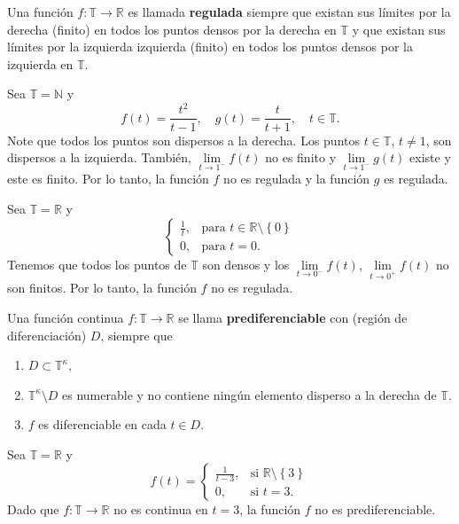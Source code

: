 \begin{frame}
\begin{definition}
Una función $f\colon\mathds{T}\rightarrow\mathds{R}$ es llamada \textbf{regulada} siempre que existan sus límites por la derecha (finito) en todos los puntos densos por la derecha en $\mathds{T}$ y que existan sus límites por la izquierda izquierda (finito) en todos los puntos densos por la izquierda en $\mathds{T}$.
\end{definition}

\begin{example}
Sea $\mathds{T}=\mathds{N}$ y \[ f\left(t\right)=\frac{t^{2}}{t-1},\quad g\left(t\right)=\frac{t}{t+1},\quad t\in\mathds{T}. \] Note que todos los puntos son dispersos a la derecha. Los puntos $t\in\mathds{T}$, $t\neq1$, son dispersos a la izquierda. También, $\lim\limits_{t\to1^{-}}f\left(t\right)$ no es finito y $\lim\limits_{t\to1^{-}}g\left(t\right)$ existe y este es finito. Por lo tanto, la función $f$ no es regulada y la función $g$ es regulada.
\end{example}

\begin{example}
Sea $\mathds{T}=\mathds{R}$ y \[ \begin{cases}\frac{1}{t},&\text{para }t\in\mathds{R}\setminus\left\{0\right\}\\0,&\text{para }t=0.\end{cases} \] Tenemos que todos los puntos de $\mathds{T}$ son densos y los $\lim\limits_{t\to 0^{-}}f\left(t\right)$, $\lim\limits_{t\to 0^{+}}f\left(t\right)$ no son finitos. Por lo tanto, la función $f$ no es regulada.
\end{example}
\end{frame}

\begin{frame}
	\begin{definition}
		Una función continua $f\colon\mathds{T}\rightarrow\mathds{R}$ se llama \textbf{prediferenciable} con (región de diferenciación) $D$, siempre que
		\begin{enumerate}
			\item $D\subset\mathds{T}^{\kappa}$,
			\item $\mathds{T}^{\kappa}\setminus D$ es numerable y no contiene ningún elemento disperso a la derecha de $\mathds{T}$.
			\item $f$ es diferenciable en cada $t\in D$.
		\end{enumerate}
	\end{definition}

	\begin{example}
		Sea $\mathds{T}=\mathds{R}$ y \[ f\left(t\right)=\begin{cases}\frac{1}{t-3},&\text{si }\mathds{R}\setminus\left\{3\right\}\\
		0,&\text{si }t=3.\end{cases} \] Dado que $f\colon\mathds{T}\rightarrow\mathds{R}$ no es continua en $t=3$, la función $f$ no es prediferenciable.
	\end{example}
\end{frame}

